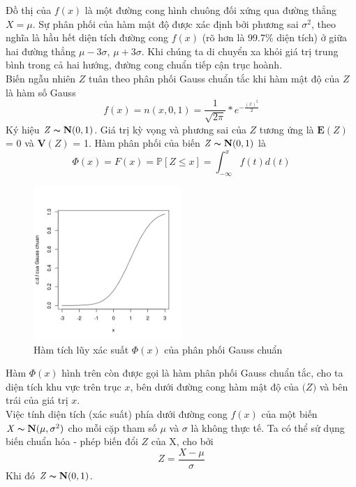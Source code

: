 \documentclass[a4paper, 13pt]{report}
\begin{document}
Đồ thị của $f(x)$ là một đường cong hình chuông đối xứng qua đường thẳng $\mathit{X} = \mu$. Sự phân phối của hàm mật độ được xác định bởi phương sai $\sigma^2$, theo nghĩa là hầu hết diện tích đường cong $f(x)$ (rõ hơn là 99.7\% diện tích) ở giữa hai đường thẳng $\mu-3\sigma$, $\mu+3\sigma$. Khi chúng ta di chuyển xa khỏi giá trị trung bình trong cả hai hướng, đường cong chuẩn tiếp cận trục hoành.\\
Biến ngẫu nhiên $\mathit{Z}$ tuân theo phân phối Gauss chuẩn tắc khi hàm mật độ của $\mathit{Z}$ là hàm số Gauss
\[
f(x) = n(x,0,1)=\frac{1}{\sqrt{2\pi}} * e^{-\frac{(x)^2}{2}}
\] 
Ký hiệu $\mathit{Z} \thicksim \textbf{N}(0,1)$. Giá trị kỳ vọng và phương sai của $\mathit{Z}$ tương ứng là $\textbf{E}(\mathit{Z})$ = 0 và $\textbf{V}(\mathit{Z})$ = 1. Hàm phân phối của biến $\mathit{Z} \thicksim \textbf{N}(0,1)$ là
\[
\Phi(x)= F(x) = \mathbb{P}[Z \leq x] = \int_{-\infty}^{x} f(t)d(t)
\] 
\FloatBarrier
\begin{figure}[h]
  \centering
    \includegraphics[width=0.5\textwidth]{standardNormalCDF.png}    
    \caption{Hàm tích lũy xác suất $\Phi(x)$ của phân phối Gauss chuẩn}
\end{figure}
\FloatBarrier
Hàm $\Phi(x)$ hình trên còn được gọi là hàm phân phối Gauss chuẩn tắc, cho ta diện tích khu vực trên trục $x$, bên dưới đường cong hàm mật độ của $\mathit(Z)$ và bên trái của giá trị $x$.\\
Việc tính diện tích (xác suất) phía dưới đường cong $f(x)$ của một biến $\mathit{X} \thicksim \textbf{N}(\mu,\sigma^2)$ cho mỗi cặp tham số $\mu$ và $\sigma$ là không thực tế. Ta có thể sử dụng biến chuẩn hóa - phép biến đổi $\mathit{Z}$ của X, cho bởi
\[
Z = \frac{X-\mu}{\sigma}
\]
Khi đó $\mathit{Z} \thicksim \textbf{N}(0,1)$.
\end{document}
